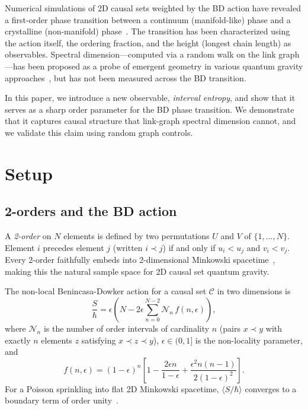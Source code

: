 \documentclass[aps,prd,twocolumn,superscriptaddress,nofootinbib]{revtex4-2}
\begin{document}
Numerical simulations of 2D causal sets weighted by the BD action have revealed a first-order phase transition between a continuum (manifold-like) phase and a crystalline (non-manifold) phase~\cite{surya2012,glaser2018}. The transition has been characterized using the action itself, the ordering fraction, and the height (longest chain length) as observables. Spectral dimension---computed via a random walk on the link graph---has been proposed as a probe of emergent geometry in various quantum gravity approaches~\cite{carlip2017}, but has not been measured across the BD transition.

In this paper, we introduce a new observable, \emph{interval entropy}, and show that it serves as a sharp order parameter for the BD phase transition. We demonstrate that it captures causal structure that link-graph spectral dimension cannot, and we validate this claim using random graph controls.

\section{Setup}

\subsection{2-orders and the BD action}

A \emph{2-order} on $N$ elements is defined by two permutations $U$ and $V$ of $\{1, \ldots, N\}$. Element $i$ precedes element $j$ (written $i \prec j$) if and only if $u_i < u_j$ and $v_i < v_j$. Every 2-order faithfully embeds into 2-dimensional Minkowski spacetime~\cite{brightwell1991}, making this the natural sample space for 2D causal set quantum gravity.

The non-local Benincasa-Dowker action for a causal set $\mathcal{C}$ in two dimensions is~\cite{benincasa2010,glaser2018}
\begin{equation}
\frac{S}{\hbar} = \epsilon \left( N - 2\epsilon \sum_{n=0}^{N-2} \mathcal{N}_n \, f(n, \epsilon) \right),
\label{eq:action}
\end{equation}
where $\mathcal{N}_n$ is the number of order intervals of cardinality $n$ (pairs $x \prec y$ with exactly $n$ elements $z$ satisfying $x \prec z \prec y$), $\epsilon \in (0,1]$ is the non-locality parameter, and
\begin{equation}
f(n, \epsilon) = (1 - \epsilon)^n \left[ 1 - \frac{2\epsilon n}{1 - \epsilon} + \frac{\epsilon^2 n(n-1)}{2(1-\epsilon)^2} \right].
\end{equation}
For a Poisson sprinkling into flat 2D Minkowski spacetime, $\langle S/\hbar \rangle$ converges to a boundary term of order unity~\cite{benincasa2010}.
\end{document}
